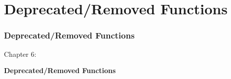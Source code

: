 %

\section{Deprecated/Removed Functions}
\begin{frame}[fragile]
	\frametitle{Deprecated/Removed Functions}

	\begin{center}\huge{Chapter 6:}\end{center}
	\begin{center}\huge{\color{typo3darkgrey}\textbf{Deprecated/Removed Functions}}\end{center}

\end{frame}


